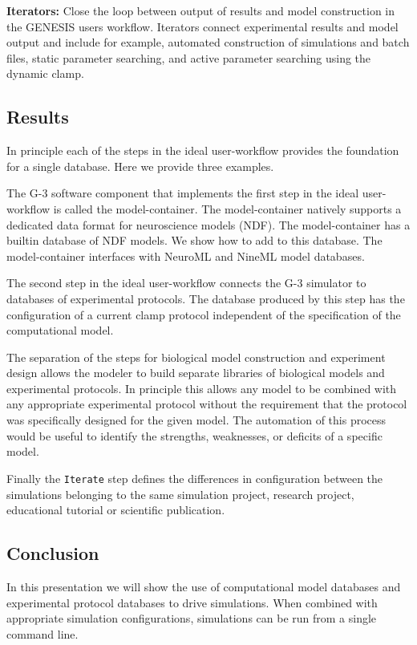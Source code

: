 \documentclass[12pt]{article}
\begin{document}
{\bf Iterators:} Close the loop between output of results and model
construction in the GENESIS users workflow. Iterators connect
experimental results and model output and include for example,
automated construction of simulations and batch files, static
parameter searching, and active parameter searching using the dynamic
clamp.

\subsection*{Results}

In principle each of the steps in the ideal user-workflow provides the
foundation for a single database.  Here we provide three examples.

The G-3 software component that implements the first step in the ideal
user-workflow is called the model-container.  The model-container
natively supports a dedicated data format for neuroscience models
(NDF).  The model-container has a builtin database of NDF models.  We
show how to add to this database.  The model-container interfaces with
NeuroML and NineML model databases.

The second step in the ideal user-workflow connects the G-3 simulator
to databases of experimental protocols.  The database produced by this
step has the configuration of a current clamp protocol independent of
the specification of the computational model.

The separation of the steps for biological model construction and
experiment design allows the modeler to build separate libraries of
biological models and experimental protocols.  In principle this
allows any model to be combined with any appropriate experimental
protocol without the requirement that the protocol was specifically
designed for the given model.  The automation of this process would be
useful to identify the strengths, weaknesses, or deficits of a
specific model.

Finally the {\tt Iterate} step defines the differences in
configuration between the simulations belonging to the same simulation
project, research project, educational tutorial or scientific
publication.

\subsection*{Conclusion}

In this presentation we will show the use of computational model
databases and experimental protocol databases to drive simulations.
When combined with appropriate simulation configurations, simulations
can be run from a single command line.
\end{document}
